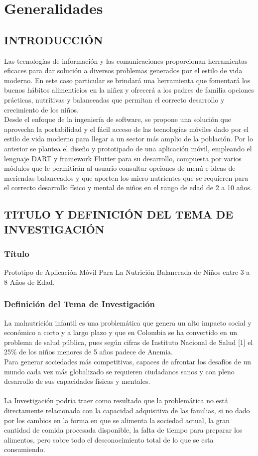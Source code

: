 \chapter{Generalidades}
\section{INTRODUCCIÓN}
Las tecnologías de información y las comunicaciones proporcionan herramientas eficaces para dar solución a diversos problemas generados por el estilo de vida moderno. En este caso particular se brindará una herramienta que fomentará los buenos hábitos alimenticios en la niñez y ofrecerá a los padres de familia opciones prácticas, nutritivas y balanceadas que permitan el correcto desarrollo y crecimiento de los niños.\\
Desde el enfoque de la ingeniería de software, se propone una solución que aprovecha la portabilidad y el fácil acceso de las tecnologías móviles dado por el estilo de vida moderno para llegar a un sector más amplio de la población.  Por lo anterior se plantea el diseño y prototipado de una aplicación móvil, empleando el lenguaje DART y framework Flutter para su desarrollo, compuesta por varios módulos que le permitirán al usuario consultar opciones de menú e ideas de meriendas balanceados y que aporten los micro-nutrientes que se requieren para el correcto desarrollo físico y mental de niños en el rango de edad de 2 a 10 años.\\
\section{TITULO Y DEFINICIÓN DEL TEMA DE INVESTIGACIÓN}
\subsection{Título}
Prototipo de Aplicación Móvil Para La Nutrición Balanceada de Niños entre 3 a 8 Años de Edad.\\
\subsection{Definición del Tema de Investigación}
La malnutrición infantil es una problemática que genera un alto impacto social y económico a corto y a largo plazo y que en Colombia se ha convertido en un problema de salud pública, pues según cifras de Instituto Nacional de Salud [1] el 25\% de los niños menores de 5 años padece de Anemia.\\
Para generar sociedades más competitivas, capaces de afrontar los desafíos de un mundo cada vez más globalizado se requieren ciudadanos sanos y con pleno desarrollo de sus capacidades físicas y mentales. \\\\
La Investigación podría traer como resultado que la problemática no está directamente relacionada con la capacidad adquisitiva de las familias, si no dado por los cambios en la forma en que se alimenta la sociedad actual, la gran cantidad de comida procesada disponible, la falta de tiempo para preparar los alimentos, pero sobre todo el desconocimiento total de lo que se esta consumiendo.


